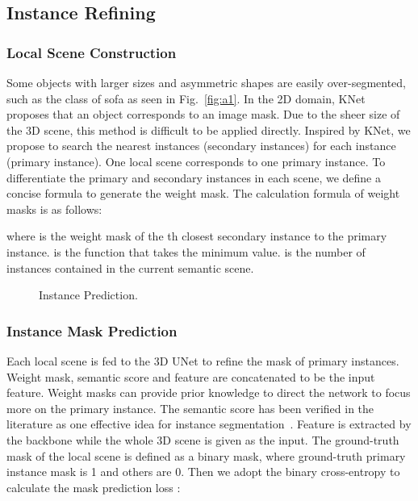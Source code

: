 \documentclass[10pt,twocolumn,letterpaper]{article}
\begin{document}
\subsection{Instance Refining}

\subsubsection{Local Scene Construction}
Some objects with larger sizes and asymmetric shapes are easily over-segmented, such as the class of sofa as seen in  Fig.~\ref{fig:a1}. In the 2D domain, KNet~\cite{zhang2021k} proposes  that an object corresponds to an image mask. Due to the sheer size of the 3D scene, this method is difficult to be applied directly. Inspired by KNet, we propose to search the nearest  instances (secondary instances) for each instance (primary instance). One local scene corresponds to one primary instance. To differentiate the primary and secondary instances in each scene, we define a concise formula to generate the weight mask. The calculation formula of weight masks  is as follows:

where  is the weight mask of the th closest secondary instance to the primary instance.  is the function that takes the minimum value.  is the number of instances contained in the current semantic scene.

\begin{figure}[t]
  \centering
  \hfill
  \caption{Instance Prediction.}
  \label{fig:local}
\end{figure}


\subsubsection{Instance Mask Prediction}
Each local scene is fed to the 3D UNet to refine the mask of primary instances.  Weight mask, semantic score and feature   are concatenated to be the input feature. Weight masks can provide prior knowledge to direct the network to focus more on the primary instance. The semantic score has been verified in the literature as one effective idea for instance segmentation~\cite{liang2021instance}. Feature  is extracted by the backbone while the whole 3D scene is given as the input. The ground-truth mask of the local scene is defined as a binary mask, where ground-truth primary instance mask is 1 and others are 0.  Then we adopt the binary cross-entropy to calculate the mask prediction loss :
\end{document}
